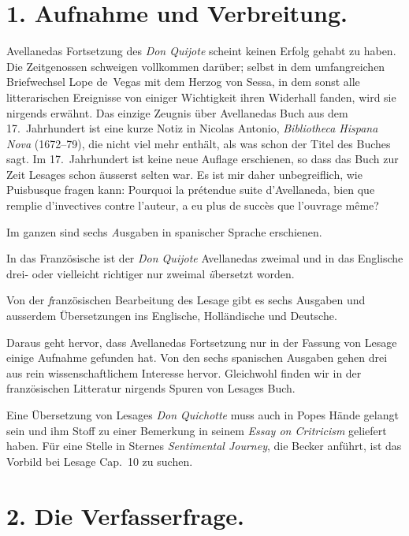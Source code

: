 \section{1. Aufnahme und Verbreitung.}

Avellanedas Fortsetzung des {\it Don Quijote} scheint keinen Erfolg
gehabt zu haben. Die Zeitgenossen schweigen vollkommen darüber;
selbst in dem umfangreichen Briefwechsel Lope de~Vegas mit dem
Herzog von Sessa, in dem sonst alle litterarischen Ereignisse von einiger
Wichtigkeit ihren Widerhall fanden, wird sie nirgends erwähnt. Das
einzige Zeugnis über Avellanedas Buch aus dem 17.~Jahrhundert ist eine
kurze Notiz in Nicolas Antonio, {\it Bibliotheca Hispana Nova}
(1672--79),
die nicht viel mehr enthält, als was schon der Titel des Buches sagt.
Im 17.~Jahrhundert ist keine neue Auflage erschienen, so dass das Buch zur
Zeit Lesages schon äusserst selten war. Es ist mir daher
unbegreiflich, wie Puisbusque
fragen kann: {\itquoted Pourquoi la prétendue suite
d'Avellaneda, bien que remplie d'invectives contre l'auteur, a eu plus
de succès que l'ouvrage même?}

Im ganzen sind sechs {\emph Ausgaben in spanischer Sprache}
erschienen.

In das Französische ist der {\it Don Quijote} Avellanedas
zweimal
und in das Englische drei- oder vielleicht richtiger nur zweimal
{\emph übersetzt} worden.

Von der {\emph französischen Bearbeitung des Lesage} gibt
es sechs Ausgaben und ausserdem Übersetzungen ins Englische,
Holländische und Deutsche.

Daraus geht hervor, dass Avellanedas Fortsetzung nur in der
Fassung von Lesage einige Aufnahme gefunden hat. Von den sechs
spanischen Ausgaben gehen drei aus rein wissenschaftlichem Interesse
hervor. Gleichwohl finden wir in der französischen Litteratur nirgends
Spuren von Lesages Buch.

Eine Übersetzung von Lesages {\it Don Quichotte} muss auch in Popes
Hände gelangt sein und ihm Stoff zu einer Bemerkung in seinem
{\it Essay on Critricism} geliefert haben. Für eine Stelle in
Sternes {\it Sentimental Journey},
die Becker anführt,
ist das Vorbild bei Lesage Cap.~10 zu suchen.

\section{2. Die Verfasserfrage.}

